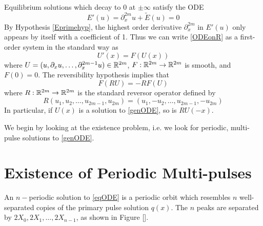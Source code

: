 \documentclass[thesis.tex]{subfiles}
\begin{document}
Equilibrium solutions which decay to 0 at $\pm \infty$ satisfy the ODE 
\begin{equation}\label{ODEonR}
E'(u) = \partial_x^{2m}u + \tilde{E}(u) = 0
\end{equation}
By Hypothesis \ref{Eprimehyp}, the highest order derivative $\partial_x^{2m}$ in $E'(u)$ only appears by itself with a coefficient of 1. Thus we can write \eqref{ODEonR} as a first-order system in the standard way as
\begin{equation}\label{genODE}
U'(x) = F(U(x))
\end{equation}
where $U = (u, \partial_x u, \dots, \partial_x^{2m-1} u) \in {\mathbb R}^{2m}$, $F: {\mathbb R}^{2m} \rightarrow {\mathbb R}^{2m}$ is smooth, and $F(0) = 0$. The reversibility hypothesis implies that
\begin{equation}\label{genODErev}
F(RU) = -RF(U)
\end{equation}
where $R:{\mathbb R}^{2m} \rightarrow {\mathbb R}^{2m}$ is the standard reversor operator defined by
\begin{equation}\label{reverserR2m}
R(u_1, u_2, \dots, u_{2m-1}, u_{2m}) = (u_1, -u_2, \dots, u_{2m-1}, -u_{2m})
\end{equation}
In particular, if $U(x)$ is a solution to \eqref{genODE}, so is $RU(-x)$.

We begin by looking at the existence problem, i.e. we look for periodic, multi-pulse solutions to \eqref{genODE}.

\section{Existence of Periodic Multi-pulses}

An $n-$periodic solution to \eqref{eqODE} is a periodic orbit which resembles $n$ well-separated copies of the primary pulse solution $q(x)$. The $n$ peaks are separated by $2X_0, 2X_1, \dots, 2X_{n-1}$, as shown in Figure [].
\end{document}
